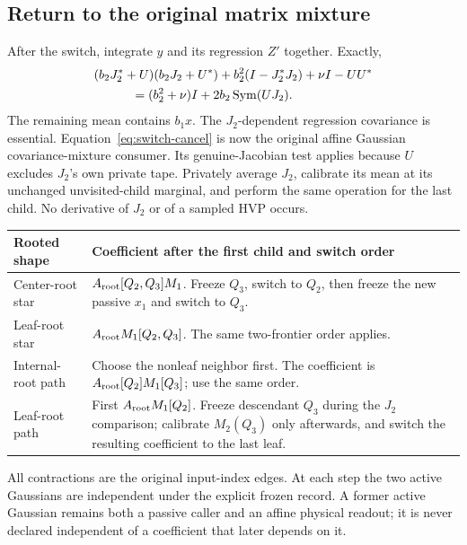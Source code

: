 \documentclass[11pt]{article}
\numberwithin{equation}{section}
\theoremstyle{remark}\newtheorem{remark}[theorem]{Remark}
\newcommand{\Sym}{\operatorname{Sym}}\newcommand{\HS}{\mathrm{HS}}
\begin{document}
\subsection{Return to the original matrix mixture}
After the switch, integrate $y$ and its regression $Z'$ together. Exactly,
\begin{align}\label{eq:switch-cancel}
 &(b_2J_2^*+U)(b_2J_2+U^*)
   +b_2^2(I-J_2^*J_2)+\nu I-UU^*\notag\\
 &\hspace{3em}=(b_2^2+\nu)I+2b_2\Sym(UJ_2).
\end{align}
The remaining mean contains $b_1x$. The $J_2$-dependent regression covariance is essential. Equation~\eqref{eq:switch-cancel} is now the original affine Gaussian covariance-mixture consumer. Its genuine-Jacobian test applies because $U$ excludes $J_2$'s own private tape. Privately average $J_2$, calibrate its mean at its unchanged unvisited-child marginal, and perform the same operation for the last child. No derivative of $J_2$ or of a sampled HVP occurs.

\begin{center}\small
\begin{tabular}{p{}p{}}
\toprule
Rooted shape & Coefficient after the first child and switch order\\
\midrule
Center-root star & $A_{\rm root}[Q_2,Q_3]M_1$. Freeze $Q_3$, switch to $Q_2$, then freeze the new passive $x_1$ and switch to $Q_3$.\\[3pt]
Leaf-root star & $A_{\rm root}M_1[Q_2,Q_3]$. The same two-frontier order applies.\\[3pt]
Internal-root path & Choose the nonleaf neighbor first. The coefficient is $A_{\rm root}[Q_2]M_1[Q_3]$; use the same order.\\[3pt]
Leaf-root path & First $A_{\rm root}M_1[Q_2]$. Freeze descendant $Q_3$ during the $J_2$ comparison; calibrate $M_2(Q_3)$ only afterwards, and switch the resulting coefficient to the last leaf.\\
\bottomrule
\end{tabular}
\end{center}
All contractions are the original input-index edges. At each step the two active Gaussians are independent under the explicit frozen record. A former active Gaussian remains both a passive caller and an affine physical readout; it is never declared independent of a coefficient that later depends on it.
\end{document}
